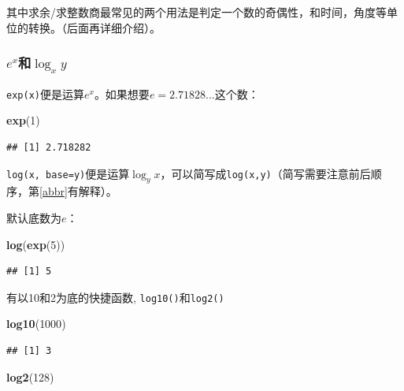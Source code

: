 \documentclass[]{book}
\newenvironment{Shaded}{\begin{snugshade}}{\end{snugshade}}
\newcommand{\DecValTok}[1]{\textcolor[rgb]{0.00,0.00,0.81}{#1}}
\newcommand{\KeywordTok}[1]{\textcolor[rgb]{0.13,0.29,0.53}{\textbf{#1}}}
\newcommand{\NormalTok}[1]{#1}
\begin{document}
其中求余/求整数商最常见的两个用法是判定一个数的奇偶性，和时间，角度等单位的转换。（后面再详细介绍）。

\hypertarget{math-exponent-log}{%
\subsubsection{\texorpdfstring{\(e^x\)和\(\log_x{y}\)}{e\^{}x和\textbackslash{}log\_x\{y\}}}\label{math-exponent-log}}

\texttt{exp(x)}便是运算\(e^x\)。如果想要\(e=2.71828...\)这个数：

\begin{Shaded}
\begin{Highlighting}[]
\KeywordTok{exp}\NormalTok{(}\DecValTok{1}\NormalTok{)}
\end{Highlighting}
\end{Shaded}

\begin{verbatim}
## [1] 2.718282
\end{verbatim}

\texttt{log(x,\ base=y)}便是运算\(\log_y{x}\)，可以简写成\texttt{log(x,y)}（简写需要注意前后顺序，第\ref{abbr}有解释）。

默认底数为\(e\)：

\begin{Shaded}
\begin{Highlighting}[]
\KeywordTok{log}\NormalTok{(}\KeywordTok{exp}\NormalTok{(}\DecValTok{5}\NormalTok{))}
\end{Highlighting}
\end{Shaded}

\begin{verbatim}
## [1] 5
\end{verbatim}

有以10和2为底的快捷函数, \texttt{log10()}和\texttt{log2()}

\begin{Shaded}
\begin{Highlighting}[]
\KeywordTok{log10}\NormalTok{(}\DecValTok{1000}\NormalTok{)}
\end{Highlighting}
\end{Shaded}

\begin{verbatim}
## [1] 3
\end{verbatim}

\begin{Shaded}
\begin{Highlighting}[]
\KeywordTok{log2}\NormalTok{(}\DecValTok{128}\NormalTok{)}
\end{Highlighting}
\end{Shaded}
\end{document}
